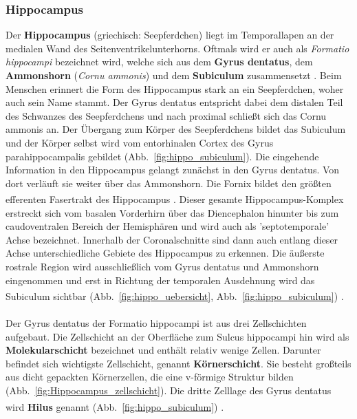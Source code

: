 \subsubsection*{Hippocampus} 
Der \textbf{Hippocampus} (griechisch: Seepferdchen) liegt im Temporallapen an der medialen Wand des Seitenventrikelunterhorns. Oftmals wird er auch als \textit{Formatio hippocampi}  bezeichnet wird, welche sich aus dem \textbf{Gyrus dentatus}, dem \textbf{Ammonshorn} (\textit{Cornu ammonis}) und dem \textbf{Subiculum} zusammensetzt . Beim Menschen erinnert die Form des Hippocampus stark an ein Seepferdchen, woher auch sein Name stammt. Der Gyrus dentatus entspricht dabei dem distalen Teil des Schwanzes des Seepferdchens und nach proximal schließt sich das Cornu ammonis an. Der Übergang zum Körper des Seepferdchens bildet das Subiculum und der Körper selbst wird vom entorhinalen Cortex des Gyrus parahippocampalis gebildet (Abb.~\ref{fig:hippo_subiculum}). Die eingehende Information in den Hippocampus gelangt zunächst in den Gyrus dentatus. Von dort verläuft sie weiter über das Ammonshorn. Die Fornix bildet den größten efferenten Fasertrakt des Hippocampus \textsuperscript{\cite[Kap.~9]{trepel2011neuroanatomie}}. Dieser gesamte Hippocampus-Komplex erstreckt sich vom basalen Vorderhirn über das Diencephalon hinunter bis zum caudoventralen Bereich der Hemisphären und wird auch als 'septotemporale' Achse bezeichnet. Innerhalb der Coronalschnitte sind dann auch entlang dieser Achse unterschiedliche Gebiete des Hippocampus zu erkennen. Die äußerste rostrale Region wird ausschließlich vom Gyrus dentatus und Ammonshorn eingenommen und erst in Richtung der temporalen Ausdehnung wird das Subiculum sichtbar (Abb.~\ref{fig:hippo_uebersicht}, Abb.~\ref{fig:hippo_subiculum}) \textsuperscript{\cite[Kap.~20]{paxinos2014rat}}.\\
\\ \noindent Der Gyrus dentatus der Formatio hippocampi ist aus drei Zellschichten aufgebaut. Die Zellschicht an der Oberfläche zum Sulcus hippocampi hin wird als \textbf{Molekularschicht} bezeichnet und enthält relativ wenige Zellen. Darunter befindet sich wichtigste Zellschicht, genannt \textbf{Körnerschicht}. Sie besteht großteils aus dicht gepackten Körnerzellen, die eine v-förmige Struktur bilden (Abb.~\ref{fig:Hippocampus_zellschicht}). Die dritte Zelllage des Gyrus dentatus wird \textbf{Hilus} genannt (Abb.~\ref{fig:hippo_subiculum}) \textsuperscript{\cite[Kap.~20]{paxinos2014rat}}.\\
